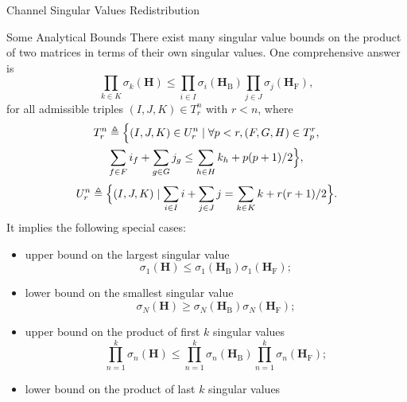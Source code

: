 \documentclass[journal]{IEEEtran}
\begin{document}
\begin{section}{Channel Singular Values Redistribution}
\begin{subsection}{Some Analytical Bounds}
		There exist many singular value bounds on the product of two matrices in terms of their own singular values.
		One comprehensive answer is \cite{Fulton2000}
		\begin{equation}
			\prod_{k \in {K}} \sigma_k(\mathbf{H}) \le \prod_{i \in {I}} \sigma_i(\mathbf{H}_\mathrm{B}) \prod_{j \in {J}} \sigma_j(\mathbf{H}_\mathrm{F}),
			\label{iq:sv_bound_fc}
		\end{equation}
		for all admissible triples $(I, J, K) \in T_r^n$ with $r < n$, where
		\begin{equation}
			\begin{gathered}
				T_r^n \triangleq \Bigl\{(I, J, K) \in U_r^n \mid \forall p < r, (F, G, H) \in T_p^r,\\
				\sum_{f \in F} i_f + \sum_{g \in G} j_g \le \sum_{h \in H} k_h + p(p+1)/2 \Bigr\},
			\end{gathered}
		\end{equation}
		\begin{equation}
			U_r^n \triangleq \Bigl\{(I, J, K) \mid \sum_{i \in I} i + \sum_{j \in J} j = \sum_{k \in K} k + r(r+1)/2\Bigr\}.
		\end{equation}
		It implies the following special cases:
		\begin{itemize}
			\item upper bound on the largest singular value
			\begin{equation}
				\sigma_1(\mathbf{H}) \le \sigma_1(\mathbf{H}_\mathrm{B}) \sigma_1(\mathbf{H}_\mathrm{F});
			\end{equation}
			\item lower bound on the smallest singular value
			\begin{equation}
				\sigma_N(\mathbf{H}) \ge \sigma_N(\mathbf{H}_\mathrm{B}) \sigma_N(\mathbf{H}_\mathrm{F});
			\end{equation}
			\item upper bound on the product of first $k$ singular values
			\begin{equation}
				\prod_{n=1}^k \sigma_n(\mathbf{H}) \le \prod_{n=1}^k \sigma_n(\mathbf{H}_\mathrm{B}) \prod_{n=1}^k \sigma_n(\mathbf{H}_\mathrm{F});
			\end{equation}
			\item lower bound on the product of last $k$ singular values

\end{itemize}
\end{subsection}
\end{section}
\end{document}
